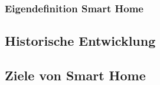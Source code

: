     \subsubsection{Eigendefinition Smart Home}
    
    \subsection{Historische Entwicklung}

    \subsection{Ziele von Smart Home}